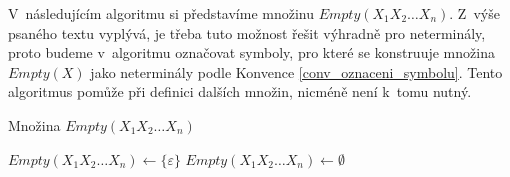 V~následujícím algoritmu si představíme množinu $Empty(X_1X_2\ldots X_n)$.
Z~výše psaného textu vyplývá, je třeba tuto možnost řešit výhradně pro neterminály, proto budeme v~algoritmu označovat symboly, pro které se konstruuje množina $Empty(X)$ jako neterminály podle Konvence \ref{conv_oznaceni_symbolu}.
Tento algoritmus pomůže při definici dalších množin, nicméně není k~tomu nutný. 
\begin{algorithm}[h]
    \caption{Množina $Empty(X_1X_2\ldots X_n)$}
    \label{alg_mnozina_empty_vicn}
    \begin{algorithmic}[1]
        \NewLine
            \State $Empty(X_1X_2\ldots X_n) \gets \{\varepsilon\}$
        \Else
            \State $Empty(X_1X_2\ldots X_n) \gets \emptyset$
        \EndIf
    \end{algorithmic}
\end{algorithm}

